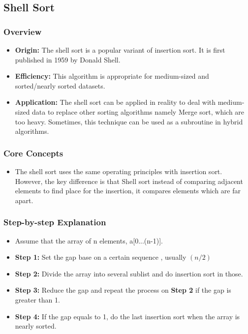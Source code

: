 \subsection[Shell Sort]{Shell Sort \cite{afzal2007enhancedshellsort}}
    \subsubsection{Overview}
        \begin{itemize}
            \item \textbf{Origin: } The shell sort is a popular variant of insertion sort. It is first published in 1959 by Donald Shell.
            \item \textbf{Efficiency: } This algorithm is appropriate for medium-sized and sorted/nearly sorted datasets.
            \item \textbf{Application: } The shell sort can be applied in reality to deal with medium-sized data to replace other sorting algorithms namely Merge sort, which are too heavy. Sometimes, this technique can be used as a subroutine in hybrid algorithms. 
        \end{itemize}
    \subsubsection{Core Concepts}
        \begin{itemize}
            \item The shell sort uses the same operating principles with insertion sort. However, the key difference is that Shell sort instead of comparing adjacent elements to find place for the insertion, it compares elements which are far apart.
        \end{itemize}
    \subsubsection{Step-by-step Explanation}
    \begin{itemize}
        \item Assume that the array of n elements, a[0...(n-1)].
        \item \textbf{Step 1: } Set the gap base on a certain sequence , usually $(n/2)$
        \item \textbf{Step 2: } Divide the array into several sublist and do insertion sort in those.
        \item \textbf{Step 3: } Reduce the gap and repeat the process on \textbf{Step 2} if the gap is greater than 1.
        \item \textbf{Step 4: } If the gap equals to 1, do the last insertion sort when the array is nearly sorted.
    \end{itemize}
